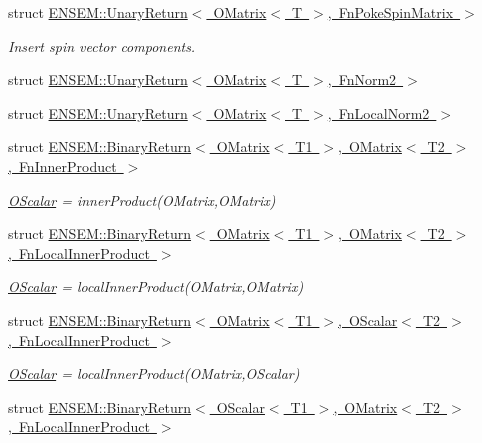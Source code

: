 \begin{DoxyCompactItemize}
struct \mbox{\hyperlink{structENSEM_1_1UnaryReturn_3_01OMatrix_3_01T_01_4_00_01FnPokeSpinMatrix_01_4}{E\+N\+S\+E\+M\+::\+Unary\+Return$<$ O\+Matrix$<$ T $>$, Fn\+Poke\+Spin\+Matrix $>$}}
\begin{DoxyCompactList}\small\item\em Insert spin vector components. \end{DoxyCompactList}\item 
struct \mbox{\hyperlink{structENSEM_1_1UnaryReturn_3_01OMatrix_3_01T_01_4_00_01FnNorm2_01_4}{E\+N\+S\+E\+M\+::\+Unary\+Return$<$ O\+Matrix$<$ T $>$, Fn\+Norm2 $>$}}
\item 
struct \mbox{\hyperlink{structENSEM_1_1UnaryReturn_3_01OMatrix_3_01T_01_4_00_01FnLocalNorm2_01_4}{E\+N\+S\+E\+M\+::\+Unary\+Return$<$ O\+Matrix$<$ T $>$, Fn\+Local\+Norm2 $>$}}
\item 
struct \mbox{\hyperlink{structENSEM_1_1BinaryReturn_3_01OMatrix_3_01T1_01_4_00_01OMatrix_3_01T2_01_4_00_01FnInnerProduct_01_4}{E\+N\+S\+E\+M\+::\+Binary\+Return$<$ O\+Matrix$<$ T1 $>$, O\+Matrix$<$ T2 $>$, Fn\+Inner\+Product $>$}}
\begin{DoxyCompactList}\small\item\em \mbox{\hyperlink{classENSEM_1_1OScalar}{O\+Scalar}} = inner\+Product(\+O\+Matrix,\+O\+Matrix) \end{DoxyCompactList}\item 
struct \mbox{\hyperlink{structENSEM_1_1BinaryReturn_3_01OMatrix_3_01T1_01_4_00_01OMatrix_3_01T2_01_4_00_01FnLocalInnerProduct_01_4}{E\+N\+S\+E\+M\+::\+Binary\+Return$<$ O\+Matrix$<$ T1 $>$, O\+Matrix$<$ T2 $>$, Fn\+Local\+Inner\+Product $>$}}
\begin{DoxyCompactList}\small\item\em \mbox{\hyperlink{classENSEM_1_1OScalar}{O\+Scalar}} = local\+Inner\+Product(\+O\+Matrix,\+O\+Matrix) \end{DoxyCompactList}\item 
struct \mbox{\hyperlink{structENSEM_1_1BinaryReturn_3_01OMatrix_3_01T1_01_4_00_01OScalar_3_01T2_01_4_00_01FnLocalInnerProduct_01_4}{E\+N\+S\+E\+M\+::\+Binary\+Return$<$ O\+Matrix$<$ T1 $>$, O\+Scalar$<$ T2 $>$, Fn\+Local\+Inner\+Product $>$}}
\begin{DoxyCompactList}\small\item\em \mbox{\hyperlink{classENSEM_1_1OScalar}{O\+Scalar}} = local\+Inner\+Product(\+O\+Matrix,\+O\+Scalar) \end{DoxyCompactList}\item 
struct \mbox{\hyperlink{structENSEM_1_1BinaryReturn_3_01OScalar_3_01T1_01_4_00_01OMatrix_3_01T2_01_4_00_01FnLocalInnerProduct_01_4}{E\+N\+S\+E\+M\+::\+Binary\+Return$<$ O\+Scalar$<$ T1 $>$, O\+Matrix$<$ T2 $>$, Fn\+Local\+Inner\+Product $>$}}

\end{DoxyCompactItemize}
